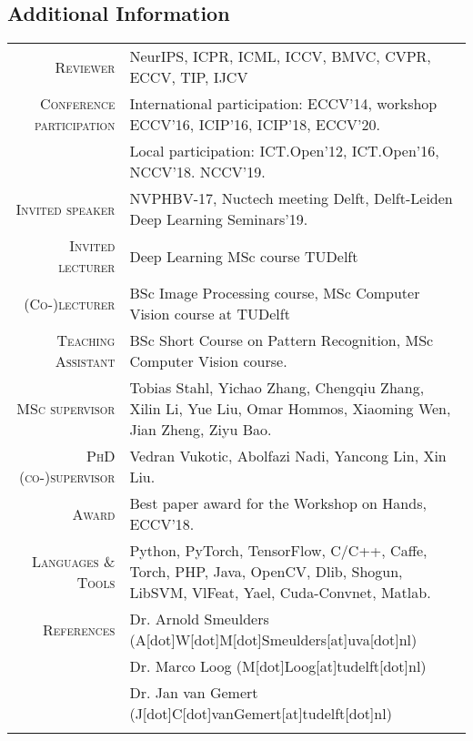 \documentclass[a4paper, oneside, final]{scrartcl}
\begin{document}
\begin{center}
		\section{Additional Information}
		\begin{tabular}{r@{\hskip 0.3in}p{11.3cm}}
            \textsc{Reviewer}                   & NeurIPS, ICPR, ICML, ICCV, BMVC, CVPR, ECCV, TIP, IJCV\\
            \textsc{Conference participation}   & International participation: ECCV'14, workshop ECCV'16, ICIP'16, ICIP'18, ECCV'20.\\ 
                                                & Local participation: ICT.Open'12, ICT.Open'16, NCCV'18. NCCV'19.\\
            \textsc{Invited speaker}            & NVPHBV-17, Nuctech meeting Delft, Delft-Leiden Deep Learning Seminars'19.\\
            \textsc{Invited lecturer}           & Deep Learning MSc course TUDelft\\
			\textsc{(Co-)lecturer}		        & BSc Image Processing course, MSc Computer Vision course at TUDelft\\
            \textsc{Teaching Assistant}         & BSc Short Course on Pattern Recognition, MSc Computer Vision course.\\ 
			\textsc{MSc supervisor}             & Tobias Stahl, Yichao Zhang, Chengqiu Zhang, Xilin Li, Yue Liu, Omar Hommos, Xiaoming Wen, Jian Zheng, Ziyu Bao.\\
			\textsc{PhD (co-)supervisor}        & Vedran Vukotic, Abolfazi Nadi, Yancong Lin, Xin Liu.\\[5px] 
            \textsc{Award}                      & Best paper award for the Workshop on Hands, ECCV'18.\\  
			\textsc{Languages \& Tools}         & Python, PyTorch, TensorFlow, C\slash C++, Caffe, Torch, PHP, 
                                                Java, OpenCV, Dlib, Shogun, LibSVM, VlFeat, Yael, Cuda-Convnet, Matlab.\\

			\textsc{References} & Dr. Arnold Smeulders (A[dot]W[dot]M[dot]Smeulders[at]uva[dot]nl)\\
                                & Dr. Marco Loog (M[dot]Loog[at]tudelft[dot]nl)\\
                                & Dr. Jan van Gemert (J[dot]C[dot]vanGemert[at]tudelft[dot]nl)\\
			\multicolumn{2}{c}{}\\
		\end{tabular}
	\end{center}
\end{document}
